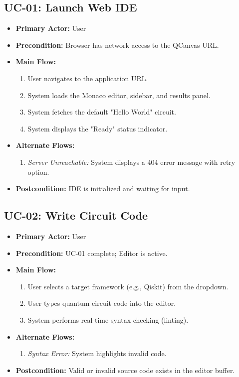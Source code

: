 \subsection{UC-01: Launch Web IDE}
\begin{itemize}
    \item \textbf{Primary Actor:} User
    \item \textbf{Precondition:} Browser has network access to the QCanvas URL.
    \item \textbf{Main Flow:}
    \begin{enumerate}
        \item User navigates to the application URL.
        \item System loads the Monaco editor, sidebar, and results panel.
        \item System fetches the default "Hello World" circuit.
        \item System displays the "Ready" status indicator.
    \end{enumerate}
    \item \textbf{Alternate Flows:}
    \begin{enumerate}
        \item [2a] \textit{Server Unreachable:} System displays a 404 error message with retry option.
    \end{enumerate}
    \item \textbf{Postcondition:} IDE is initialized and waiting for input.
\end{itemize}

\subsection{UC-02: Write Circuit Code}
\begin{itemize}
    \item \textbf{Primary Actor:} User
    \item \textbf{Precondition:} UC-01 complete; Editor is active.
    \item \textbf{Main Flow:}
    \begin{enumerate}
        \item User selects a target framework (e.g., Qiskit) from the dropdown.
        \item User types quantum circuit code into the editor.
        \item System performs real-time syntax checking (linting).
    \end{enumerate}
    \item \textbf{Alternate Flows:}
    \begin{enumerate}
        \item [2a] \textit{Syntax Error:} System highlights invalid code.
    \end{enumerate}
    \item \textbf{Postcondition:} Valid or invalid source code exists in the editor buffer.
\end{itemize}

